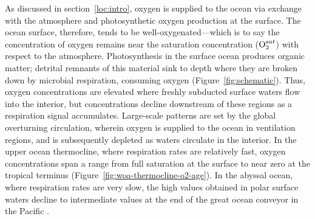 \documentclass[draft,linenumbers]{report_chapter}
\begin{document}
As discussed in section~\ref{loc:intro}, oxygen is supplied to the ocean via exchange with the atmosphere and photosynthetic oxygen production at the surface.
The ocean surface, therefore, tends to be well-oxygenated---which is to say the concentration of oxygen remains near the saturation concentration ($\ce{O2}^{sat}$) with respect to the atmosphere.
Photosynthesis in the surface ocean produces organic matter; detrital remnants of this material sink to depth where they are broken down by microbial respiration, consuming oxygen (Figure~\ref{fig:schematic}).
Thus, oxygen concentrations are elevated where freshly subducted surface waters flow into the interior, but concentrations decline downstream of these regions as a respiration signal accumulates.
Large-scale patterns are set by the global overturning circulation, wherein oxygen is supplied to the ocean in ventilation regions, and is subsequently depleted as waters circulate in the interior.
In the upper ocean thermocline, where respiration rates are relatively fast, oxygen concentrations span a range from full saturation at the surface to near zero at the tropical terminus (Figure~\ref{fig:woa-thermocline-o2-age}).
In the abyssal ocean, where respiration rates are very slow, the high  values obtained in polar surface waters decline to intermediate values at the end of the great ocean conveyor in the Pacific \citep{Broecker-1991}.
\end{document}
